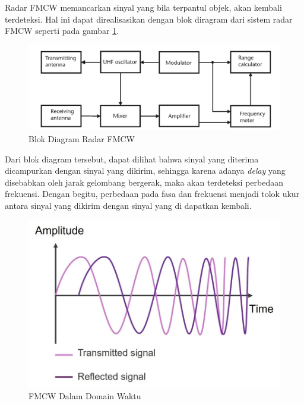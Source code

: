 Radar FMCW memancarkan sinyal yang bila terpantul objek, akan kembali terdeteksi. Hal ini dapat direalisasikan dengan blok diragram dari sistem radar FMCW seperti pada gambar \ref{pic:FMCWBlock}.  

\begin{figure}
	\begin{center}
		\includegraphics[scale=0.3]{pics/bab2/blokDiagramFMCW.png}
		\caption[Blok Diagram Radar FMCW]{Blok Diagram Radar FMCW}
		\label{pic:FMCWBlock}
	\end{center}
\end{figure}

Dari blok diagram tersebut, dapat dilihat bahwa sinyal yang diterima dicampurkan dengan sinyal yang dikirim, sehingga karena adanya \textit{delay} yang disebabkan oleh jarak gelombang bergerak, maka akan terdeteksi perbedaan frekuensi. Dengan begitu, perbedaan pada fasa dan frekuensi menjadi tolok ukur antara sinyal yang dikirim dengan sinyal yang di dapatkan kembali.

\begin{figure}
	\begin{center}
		\includegraphics[scale=0.3]{pics/bab2/txRxWave.jpg}
		\caption[FMCW Dalam Domain Waktu]{FMCW Dalam Domain Waktu}
		\label{pic:FMCWTime}
	\end{center}
\end{figure}


